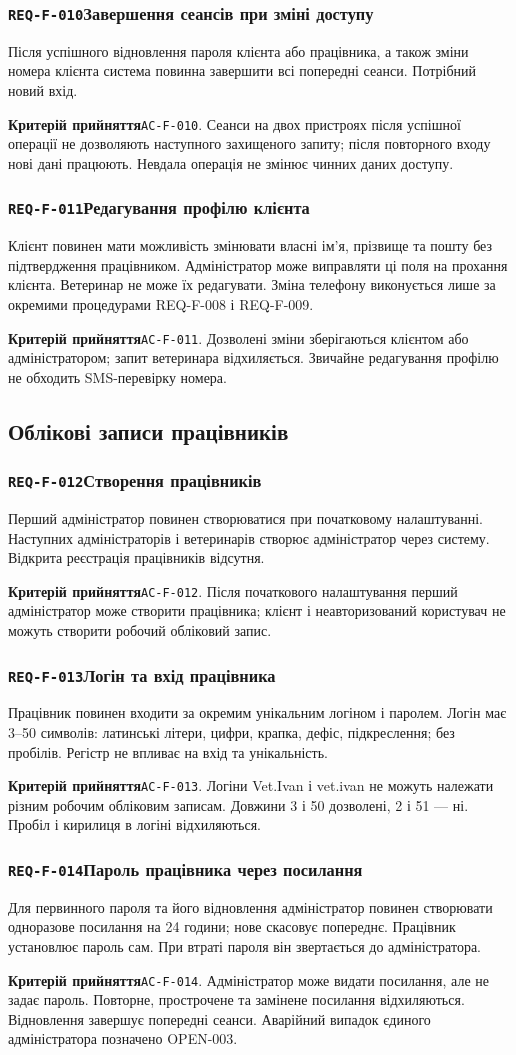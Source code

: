 \documentclass[11pt,a4paper]{article}
\newcommand{\requirement}[4]{%
  \Needspace{7\baselineskip}%
  \subsubsection*{\hypertarget{#1}{\texttt{#1}}\quad #2}%
  #3\par
  \textbf{Критерій прийняття}\quad #4\par\medskip}
\begin{document}
\requirement{REQ-F-010}{Завершення сеансів при зміні доступу}{Після успішного відновлення пароля клієнта або працівника, а також зміни номера клієнта система повинна завершити всі попередні сеанси. Потрібний новий вхід.}{\hypertarget{AC-F-010}{\texttt{AC-F-010}}. Сеанси на двох пристроях після успішної операції не дозволяють наступного захищеного запиту; після повторного входу нові дані працюють. Невдала операція не змінює чинних даних доступу.}

\requirement{REQ-F-011}{Редагування профілю клієнта}{Клієнт повинен мати можливість змінювати власні ім’я, прізвище та пошту без підтвердження працівником. Адміністратор може виправляти ці поля на прохання клієнта. Ветеринар не може їх редагувати. Зміна телефону виконується лише за окремими процедурами REQ-F-008 і REQ-F-009.}{\hypertarget{AC-F-011}{\texttt{AC-F-011}}. Дозволені зміни зберігаються клієнтом або адміністратором; запит ветеринара відхиляється. Звичайне редагування профілю не обходить SMS-перевірку номера.}

\subsection{Облікові записи працівників}
\requirement{REQ-F-012}{Створення працівників}{Перший адміністратор повинен створюватися при початковому налаштуванні. Наступних адміністраторів і ветеринарів створює адміністратор через систему. Відкрита реєстрація працівників відсутня.}{\hypertarget{AC-F-012}{\texttt{AC-F-012}}. Після початкового налаштування перший адміністратор може створити працівника; клієнт і неавторизований користувач не можуть створити робочий обліковий запис.}

\requirement{REQ-F-013}{Логін та вхід працівника}{Працівник повинен входити за окремим унікальним логіном і паролем. Логін має 3–50 символів: латинські літери, цифри, крапка, дефіс, підкреслення; без пробілів. Регістр не впливає на вхід та унікальність.}{\hypertarget{AC-F-013}{\texttt{AC-F-013}}. Логіни Vet.Ivan і vet.ivan не можуть належати різним робочим обліковим записам. Довжини 3 і 50 дозволені, 2 і 51 — ні. Пробіл і кирилиця в логіні відхиляються.}

\requirement{REQ-F-014}{Пароль працівника через посилання}{Для первинного пароля та його відновлення адміністратор повинен створювати одноразове посилання на 24 години; нове скасовує попереднє. Працівник установлює пароль сам. При втраті пароля він звертається до адміністратора.}{\hypertarget{AC-F-014}{\texttt{AC-F-014}}. Адміністратор може видати посилання, але не задає пароль. Повторне, прострочене та замінене посилання відхиляються. Відновлення завершує попередні сеанси. Аварійний випадок єдиного адміністратора позначено OPEN-003.}
\end{document}
